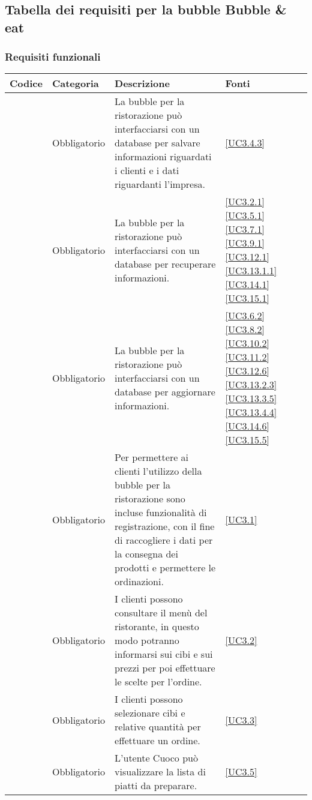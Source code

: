 \subsection{Tabella dei requisiti per la bubble Bubble \& eat}

\subsubsection{Requisiti funzionali}

\begin{longtable}{|P{1.5cm}|P{2.5cm}|P{6.5cm}|P{2.5cm}|}
	\hline \textbf{Codice} & \textbf{Categoria} & \textbf{Descrizione} & \textbf{Fonti} \\
	
	\hline \RequisitoObF\label{L21} & Obbligatorio & La bubble per la ristorazione può interfacciarsi con un database per salvare informazioni riguardati i clienti e i dati riguardanti l'impresa. &  \ref{UC3.4.3} \\
	\hline \RequisitoObF\label{L61} & Obbligatorio & La bubble per la ristorazione può interfacciarsi con un database per recuperare informazioni. & \ref{UC3.2.1} \ref{UC3.5.1} \ref{UC3.7.1}  \ref{UC3.9.1} \ref{UC3.12.1} \ref{UC3.13.1.1} \ref{UC3.14.1} \ref{UC3.15.1} \\
	\hline \RequisitoObF\label{L62} & Obbligatorio & La bubble per la ristorazione può interfacciarsi con un database per aggiornare informazioni. & \ref{UC3.6.2} \ref{UC3.8.2} \ref{UC3.10.2} \ref{UC3.11.2} \ref{UC3.12.6}  \ref{UC3.13.2.3} \ref{UC3.13.3.5} \ref{UC3.13.4.4} \ref{UC3.14.6} \ref{UC3.15.5} \\	
	\hline \RequisitoObF\label{L22} & Obbligatorio & Per permettere ai clienti l'utilizzo della bubble per la ristorazione sono incluse funzionalità di registrazione, con il fine di raccogliere i dati per la consegna dei prodotti e permettere le ordinazioni. & \ref{UC3.1} \\
	\hline \RequisitoObF\label{L23} & Obbligatorio & I clienti possono consultare il menù del ristorante, in questo modo potranno informarsi sui cibi e sui prezzi per poi effettuare le scelte per l'ordine. & \ref{UC3.2} \\
	\hline \RequisitoObF\label{L24} & Obbligatorio & I clienti possono selezionare cibi e relative quantità per effettuare un ordine. & \ref{UC3.3} \\
	\hline \RequisitoObF\label{L25} & Obbligatorio & L'utente Cuoco può visualizzare la lista di piatti da preparare. & \ref{UC3.5} \\

\end{longtable}

